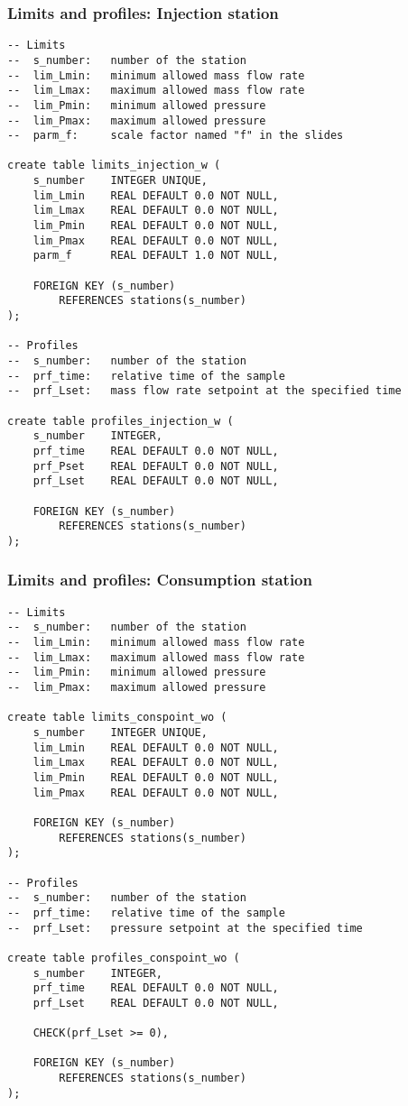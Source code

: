 \documentclass[10pt]{article}
\begin{document}
\subsubsection{Limits and profiles: Injection station}

\begin{verbatim}
-- Limits
--  s_number:   number of the station
--  lim_Lmin:   minimum allowed mass flow rate
--  lim_Lmax:   maximum allowed mass flow rate
--  lim_Pmin:   minimum allowed pressure
--  lim_Pmax:   maximum allowed pressure
--  parm_f:     scale factor named "f" in the slides

create table limits_injection_w (
    s_number    INTEGER UNIQUE,
    lim_Lmin    REAL DEFAULT 0.0 NOT NULL,
    lim_Lmax    REAL DEFAULT 0.0 NOT NULL,
    lim_Pmin    REAL DEFAULT 0.0 NOT NULL,
    lim_Pmax    REAL DEFAULT 0.0 NOT NULL,
    parm_f      REAL DEFAULT 1.0 NOT NULL,

    FOREIGN KEY (s_number)
        REFERENCES stations(s_number)
);

-- Profiles
--  s_number:   number of the station
--  prf_time:   relative time of the sample
--  prf_Lset:   mass flow rate setpoint at the specified time

create table profiles_injection_w (
    s_number    INTEGER,
    prf_time    REAL DEFAULT 0.0 NOT NULL,
    prf_Pset    REAL DEFAULT 0.0 NOT NULL,
    prf_Lset    REAL DEFAULT 0.0 NOT NULL,

    FOREIGN KEY (s_number)
        REFERENCES stations(s_number)
);
\end{verbatim}

\subsubsection{Limits and profiles: Consumption station}

\begin{verbatim}
-- Limits
--  s_number:   number of the station
--  lim_Lmin:   minimum allowed mass flow rate
--  lim_Lmax:   maximum allowed mass flow rate
--  lim_Pmin:   minimum allowed pressure
--  lim_Pmax:   maximum allowed pressure

create table limits_conspoint_wo (
    s_number    INTEGER UNIQUE,
    lim_Lmin    REAL DEFAULT 0.0 NOT NULL,
    lim_Lmax    REAL DEFAULT 0.0 NOT NULL,
    lim_Pmin    REAL DEFAULT 0.0 NOT NULL,
    lim_Pmax    REAL DEFAULT 0.0 NOT NULL,

    FOREIGN KEY (s_number)
        REFERENCES stations(s_number)
);

-- Profiles
--  s_number:   number of the station
--  prf_time:   relative time of the sample
--  prf_Lset:   pressure setpoint at the specified time

create table profiles_conspoint_wo (
    s_number    INTEGER,
    prf_time    REAL DEFAULT 0.0 NOT NULL,
    prf_Lset    REAL DEFAULT 0.0 NOT NULL,

    CHECK(prf_Lset >= 0),

    FOREIGN KEY (s_number)
        REFERENCES stations(s_number)
);
\end{verbatim}
\end{document}
